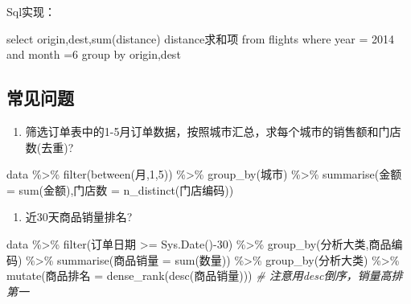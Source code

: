 \documentclass[
]{book}
\newenvironment{Shaded}{\begin{snugshade}}{\end{snugshade}}
\newcommand{\CommentTok}[1]{\textcolor[rgb]{0.56,0.35,0.01}{\textit{#1}}}
\newcommand{\DecValTok}[1]{\textcolor[rgb]{0.00,0.00,0.81}{#1}}
\newcommand{\FunctionTok}[1]{\textcolor[rgb]{0.00,0.00,0.00}{#1}}
\newcommand{\NormalTok}[1]{#1}
\newcommand{\OtherTok}[1]{\textcolor[rgb]{0.56,0.35,0.01}{#1}}
\newcommand{\SpecialCharTok}[1]{\textcolor[rgb]{0.00,0.00,0.00}{#1}}
\providecommand{\tightlist}{%
  \setlength{\itemsep}{0pt}\setlength{\parskip}{0pt}}
\begin{document}
Sql实现：

\begin{Shaded}
\begin{Highlighting}[]
\NormalTok{select origin,dest,}\FunctionTok{sum}\NormalTok{(distance) distance求和项 from flights where year }\OtherTok{=} \DecValTok{2014}\NormalTok{ and month }\OtherTok{=}\DecValTok{6}\NormalTok{ group by origin,dest}
\end{Highlighting}
\end{Shaded}

\hypertarget{ux5e38ux89c1ux95eeux9898}{%
\subsection{常见问题}\label{ux5e38ux89c1ux95eeux9898}}

\begin{enumerate}
\def\labelenumi{\arabic{enumi}.}
\tightlist
\item
  筛选订单表中的1-5月订单数据，按照城市汇总，求每个城市的销售额和门店数(去重)?
\end{enumerate}

\begin{Shaded}
\begin{Highlighting}[]
\NormalTok{data }\SpecialCharTok{\%\textgreater{}\%} 
  \FunctionTok{filter}\NormalTok{(}\FunctionTok{between}\NormalTok{(月,}\DecValTok{1}\NormalTok{,}\DecValTok{5}\NormalTok{)) }\SpecialCharTok{\%\textgreater{}\%} 
  \FunctionTok{group\_by}\NormalTok{(城市) }\SpecialCharTok{\%\textgreater{}\%} 
  \FunctionTok{summarise}\NormalTok{(金额 }\OtherTok{=} \FunctionTok{sum}\NormalTok{(金额),门店数 }\OtherTok{=} \FunctionTok{n\_distinct}\NormalTok{(门店编码))}
\end{Highlighting}
\end{Shaded}

\begin{enumerate}
\def\labelenumi{\arabic{enumi}.}
\setcounter{enumi}{1}
\tightlist
\item
  近30天商品销量排名?
\end{enumerate}

\begin{Shaded}
\begin{Highlighting}[]
\NormalTok{data }\SpecialCharTok{\%\textgreater{}\%} 
  \FunctionTok{filter}\NormalTok{(订单日期 }\SpecialCharTok{\textgreater{}=} \FunctionTok{Sys.Date}\NormalTok{()}\SpecialCharTok{{-}}\DecValTok{30}\NormalTok{) }\SpecialCharTok{\%\textgreater{}\%} 
  \FunctionTok{group\_by}\NormalTok{(分析大类,商品编码) }\SpecialCharTok{\%\textgreater{}\%} 
  \FunctionTok{summarise}\NormalTok{(商品销量 }\OtherTok{=} \FunctionTok{sum}\NormalTok{(数量)) }\SpecialCharTok{\%\textgreater{}\%} 
  \FunctionTok{group\_by}\NormalTok{(分析大类) }\SpecialCharTok{\%\textgreater{}\%} 
  \FunctionTok{mutate}\NormalTok{(商品排名 }\OtherTok{=} \FunctionTok{dense\_rank}\NormalTok{(}\FunctionTok{desc}\NormalTok{(商品销量))) }
\CommentTok{\# 注意用desc倒序，销量高排第一}
\end{Highlighting}
\end{Shaded}
\end{document}
